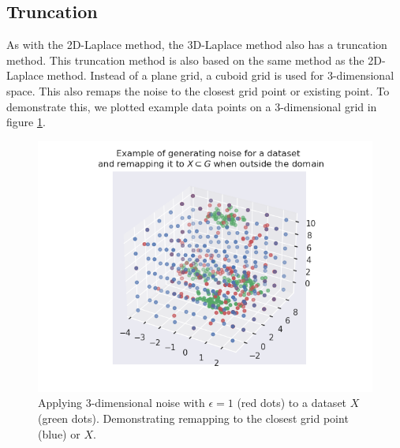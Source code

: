 \subsection{Truncation}
As with the 2D-Laplace method, the 3D-Laplace method also has a truncation method.
This truncation method is also based on the same method as the 2D-Laplace method.
Instead of a plane grid, a cuboid grid is used for 3-dimensional space.
This also remaps the noise to the closest grid point or existing point.
To demonstrate this, we plotted example data points on a 3-dimensional grid in figure \ref{fig:3d-laplace-example}.
\begin{figure} [ht]
  \includegraphics{TheorethicalFramework/ND-Laplace/Images/example_3d_laplace.png}
  \caption{Applying 3-dimensional noise with $\epsilon = 1$ (red dots) to a dataset $X$ (green dots). Demonstrating remapping to the closest grid point (blue) or $X$.}
  \label{fig:3d-laplace-example}
\end{figure}